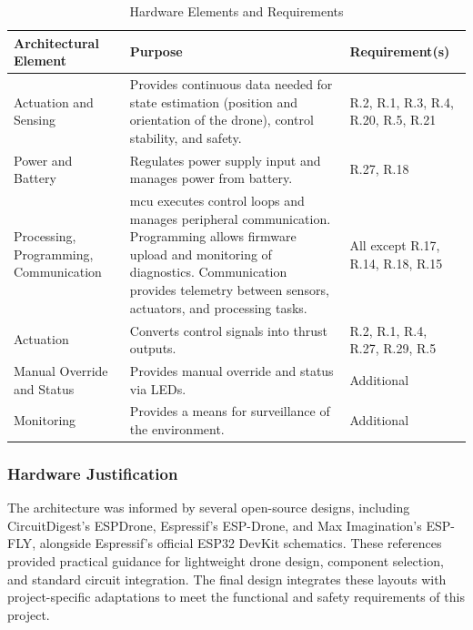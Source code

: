 \begin{table}[H]
\centering
\caption{Hardware Elements and Requirements}
\label{tab:hardware-arch}
\begin{tabular}{|m{}|m{}|m{}|}
\hline
\rowcolor{gray!15}
\textbf{Architectural Element} & \textbf{Purpose} & \textbf{Requirement(s)} \\
\hline
Actuation and Sensing & Provides continuous data needed for state estimation (position and orientation of the drone), control stability, and safety. & R.2, R.1, R.3, R.4, R.20, R.5, R.21 \\
\hline
Power and Battery  & Regulates power supply input and manages power from battery. & R.27, R.18 \\
\hline
Processing, Programming, Communication & \gls{mcu} executes control loops and manages peripheral communication.
Programming allows firmware upload and monitoring of diagnostics. Communication provides telemetry between sensors, actuators, and processing tasks. & All except R.17, R.14, R.18, R.15 \\
\hline
Actuation & Converts control signals into thrust outputs. & R.2, R.1, R.4, R.27, R.29, R.5 \\
\hline
Manual Override and Status & Provides manual override and status via LEDs. & Additional \\
\hline
Monitoring & Provides a means for surveillance of the environment. & Additional \\
\hline
\end{tabular}
\end{table}

\subsubsection{Hardware Justification}

The architecture was informed by several open-source designs, including CircuitDigest’s ESPDrone, Espressif’s ESP-Drone, and Max Imagination’s ESP-FLY, alongside Espressif’s official ESP32 DevKit schematics. These references provided practical guidance for lightweight drone design, component selection, and standard circuit integration. The final design integrates these layouts with project-specific adaptations to meet the functional and safety requirements of this project. \temp{[Sources]}

